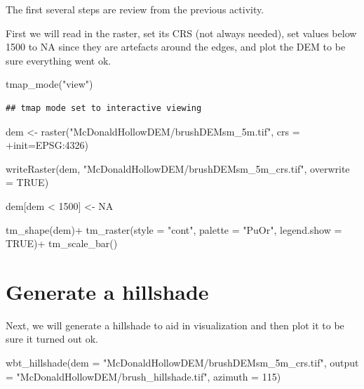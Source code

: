 \documentclass[
]{book}
\newenvironment{Shaded}{\begin{snugshade}}{\end{snugshade}}
\newcommand{\AttributeTok}[1]{\textcolor[rgb]{0.77,0.63,0.00}{#1}}
\newcommand{\ConstantTok}[1]{\textcolor[rgb]{0.00,0.00,0.00}{#1}}
\newcommand{\DecValTok}[1]{\textcolor[rgb]{0.00,0.00,0.81}{#1}}
\newcommand{\FunctionTok}[1]{\textcolor[rgb]{0.00,0.00,0.00}{#1}}
\newcommand{\NormalTok}[1]{#1}
\newcommand{\OtherTok}[1]{\textcolor[rgb]{0.56,0.35,0.01}{#1}}
\newcommand{\SpecialCharTok}[1]{\textcolor[rgb]{0.00,0.00,0.00}{#1}}
\newcommand{\StringTok}[1]{\textcolor[rgb]{0.31,0.60,0.02}{#1}}
\begin{document}
The first several steps are review from the previous activity.

First we will read in the raster, set its CRS (not always needed), set values below 1500 to NA since they are artefacts around the edges, and plot the DEM to be sure everything went ok.

\begin{Shaded}
\begin{Highlighting}[]
\FunctionTok{tmap\_mode}\NormalTok{(}\StringTok{"view"}\NormalTok{)}
\end{Highlighting}
\end{Shaded}

\begin{verbatim}
## tmap mode set to interactive viewing
\end{verbatim}

\begin{Shaded}
\begin{Highlighting}[]
\NormalTok{dem }\OtherTok{\textless{}{-}} \FunctionTok{raster}\NormalTok{(}\StringTok{"McDonaldHollowDEM/brushDEMsm\_5m.tif"}\NormalTok{, }\AttributeTok{crs =} \StringTok{\textquotesingle{}+init=EPSG:4326\textquotesingle{}}\NormalTok{)}

\FunctionTok{writeRaster}\NormalTok{(dem, }\StringTok{"McDonaldHollowDEM/brushDEMsm\_5m\_crs.tif"}\NormalTok{, }\AttributeTok{overwrite =} \ConstantTok{TRUE}\NormalTok{)}

\NormalTok{dem[dem }\SpecialCharTok{\textless{}} \DecValTok{1500}\NormalTok{] }\OtherTok{\textless{}{-}} \ConstantTok{NA}

\FunctionTok{tm\_shape}\NormalTok{(dem)}\SpecialCharTok{+}
  \FunctionTok{tm\_raster}\NormalTok{(}\AttributeTok{style =} \StringTok{"cont"}\NormalTok{, }\AttributeTok{palette =} \StringTok{"PuOr"}\NormalTok{, }\AttributeTok{legend.show =} \ConstantTok{TRUE}\NormalTok{)}\SpecialCharTok{+}
  \FunctionTok{tm\_scale\_bar}\NormalTok{()}
\end{Highlighting}
\end{Shaded}

\hypertarget{generate-a-hillshade-1}{%
\section{Generate a hillshade}\label{generate-a-hillshade-1}}

Next, we will generate a hillshade to aid in visualization and then plot it to be sure it turned out ok.

\begin{Shaded}
\begin{Highlighting}[]
\FunctionTok{wbt\_hillshade}\NormalTok{(}\AttributeTok{dem =} \StringTok{"McDonaldHollowDEM/brushDEMsm\_5m\_crs.tif"}\NormalTok{,}
              \AttributeTok{output =} \StringTok{"McDonaldHollowDEM/brush\_hillshade.tif"}\NormalTok{,}
              \AttributeTok{azimuth =} \DecValTok{115}\NormalTok{)}
\end{Highlighting}
\end{Shaded}
\end{document}
